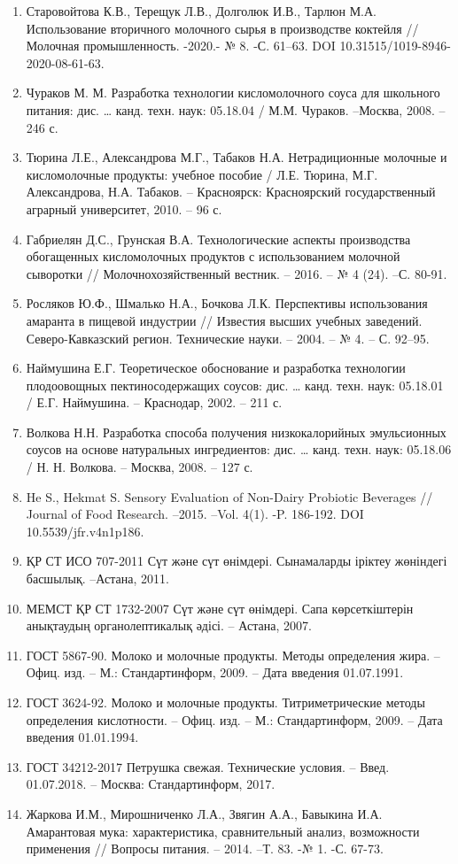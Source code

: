{\begin{enumerate}
\item
  Старовойтова К.В., Терещук Л.В., Долголюк И.В., Тарлюн М.А.
  Использование вторичного молочного сырья в производстве коктейля //
  Молочная промышленность. -2020.- № 8. -С. 61--63. DOI
  10.31515/1019-8946-2020-08-61-63.
\item
  Чураков М. М. Разработка технологии кисломолочного соуса для школьного
  питания: дис. \ldots{} канд. техн. наук: 05.18.04 / М.М. Чураков.
  --Москва, 2008. --246 с.
\item
  Тюрина Л.Е., Александрова М.Г., Табаков Н.А. Нетрадиционные молочные и
  кисломолочные продукты: учебное пособие / Л.Е. Тюрина, М.Г.
  Александрова, Н.А. Табаков. -- Красноярск: Красноярский
  государственный аграрный университет, 2010. -- 96 с.
\item
  Габриелян Д.С., Грунская В.А. Технологические аспекты производства
  обогащенных кисломолочных продуктов с использованием молочной
  сыворотки // Молочнохозяйственный вестник. -- 2016. -- № 4 (24). --С.
  80-91.
\item
  Росляков Ю.Ф., Шмалько Н.А., Бочкова Л.К. Перспективы использования
  амаранта в пищевой индустрии // Известия высших учебных заведений.
  Северо-Кавказский регион. Технические науки. -- 2004. -- № 4. -- С.
  92--95.
\item
  Наймушина Е.Г. Теоретическое обоснование и разработка технологии
  плодоовощных пектиносодержащих соусов: дис. \ldots{} канд. техн. наук:
  05.18.01 / Е.Г. Наймушина. -- Краснодар, 2002. -- 211 с.
\item
  Волкова Н.Н. Разработка способа получения низкокалорийных эмульсионных
  соусов на основе натуральных ингредиентов: дис. \ldots{} канд. техн.
  наук: 05.18.06 / Н. Н. Волкова. -- Москва, 2008. -- 127 с.
\item
  He S., Hekmat S. Sensory Evaluation of Non-Dairy Probiotic Beverages
  // Journal of Food Research. --2015. --Vol. 4(1). -P. 186-192. DOI
  10.5539/jfr.v4n1p186.
\item
  ҚР СТ ИСО 707-2011 Сүт және сүт өнімдері. Сынамаларды іріктеу
  жөніндегі басшылық. --Астана, 2011.
\item
  МЕМСТ ҚР СТ 1732-2007 Сүт және сүт өнімдері. Сапа көрсеткіштерін
  анықтаудың органолептикалық әдісі. -- Астана, 2007.
\item
  ГОСТ 5867-90. Молоко и молочные продукты. Методы определения жира. --
  Офиц. изд. -- М.: Стандартинформ, 2009. -- Дата введения 01.07.1991.
\item
  ГОСТ 3624-92. Молоко и молочные продукты. Титриметрические методы
  определения кислотности. -- Офиц. изд. -- М.: Стандартинформ, 2009. --
  Дата введения 01.01.1994.
\item
  ГОСТ 34212-2017 Петрушка свежая. Технические условия. -- Введ.
  01.07.2018. -- Москва: Стандартинформ, 2017.
\item
  Жаркова И.М., Мирошниченко Л.А., Звягин А.А., Бавыкина И.А.
  Амарантовая мука: характеристика, сравнительный анализ, возможности
  применения // Вопросы питания. -- 2014. --Т. 83. -№ 1. -С. 67-73.
\end{enumerate}

}
